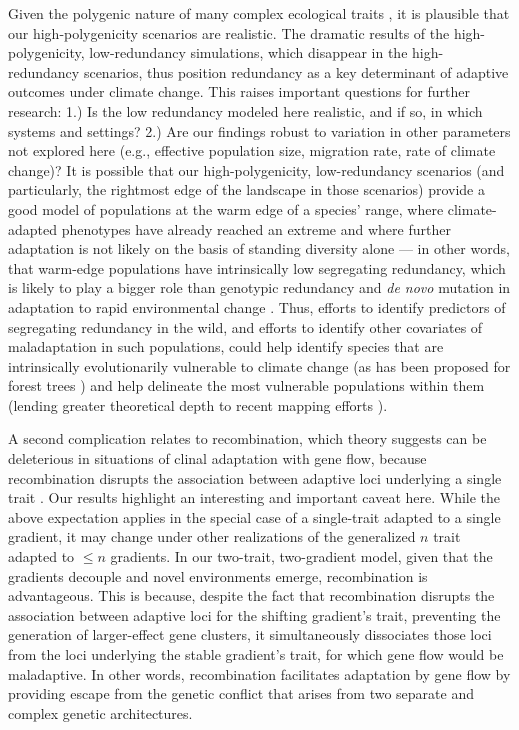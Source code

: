 \documentclass[9pt,twocolumn,twoside,lineno]{pnas-new}
\begin{document}
Given the polygenic nature of many complex ecological traits \cite{barghi_polygenic,boyle,rockman,savolainen,sella},
it is plausible that our high-polygenicity scenarios are realistic.
The dramatic results of the high-polygenicity, low-redundancy simulations,
which disappear in the high-redundancy scenarios,
thus position redundancy as a key determinant
of adaptive outcomes under climate change.
This raises important questions for further research:
1.) Is the low redundancy modeled here realistic, and if so, in which systems and settings?
2.) Are our findings robust to variation in other parameters
not explored here (e.g., effective population size, migration rate, rate of climate change)? 
It is possible that our high-polygenicity, low-redundancy scenarios
(and particularly, the rightmost edge of the landscape in those scenarios)
provide a good model of populations
at the warm edge of a species' range, where climate-adapted phenotypes have already
reached an extreme and where further adaptation is not likely
on the basis of standing diversity alone --- in other words, that warm-edge
populations have intrinsically low segregating redundancy,
which is likely to play a bigger role than genotypic redundancy and \textit{de novo} mutation
in adaptation to rapid environmental change \cite{laruson}.
Thus, efforts to identify predictors of segregating redundancy in the wild,
and efforts to identify other covariates of maladaptation in such populations,
could help identify species that are intrinsically evolutionarily vulnerable to climate change
(as has been proposed for forest trees \cite{lind,aitken_yeaman})
and help delineate the most vulnerable populations within them
(lending greater theoretical depth to recent mapping efforts \cite{bay,gougherty}).

A second complication relates to recombination,
which theory suggests can be deleterious
in situations of clinal adaptation
with gene flow, because recombination disrupts the association between adaptive loci 
underlying a single trait \cite{tigano}.
Our results highlight an interesting and important caveat here.
While the above expectation applies in the special case of a single-trait 
adapted to a single gradient,
it may change under other realizations of the 
generalized $n$ trait adapted to $\leq n$ gradients.
In our two-trait, two-gradient model, given that the gradients decouple
and novel environments emerge,
recombination is advantageous.
This is because, despite the fact that recombination disrupts the association between
adaptive loci for the shifting gradient's trait, preventing the
generation of larger-effect gene clusters,
it simultaneously dissociates those loci from the loci underlying
the stable gradient's trait, for which gene flow would be maladaptive.
In other words, recombination facilitates adaptation by gene flow
by providing escape from the genetic conflict that arises
from two separate and complex genetic architectures.
   
\end{document}
